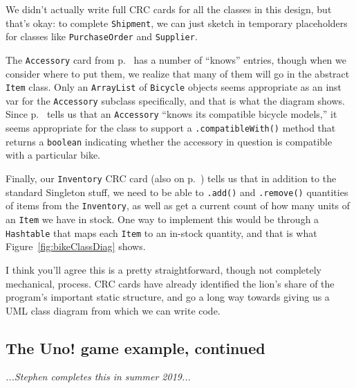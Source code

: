We didn't actually write full CRC cards for all the classes in this design, but
that's okay: to complete \texttt{Shipment}, we can just sketch in temporary
placeholders for classes like \texttt{PurchaseOrder} and \texttt{Supplier}.

The \texttt{Accessory} card from p.~\pageref{bikeCRC2} has a number of
``knows'' entries, though when we consider where to put them, we realize that
many of them will go in the abstract \texttt{Item} class. Only an
\texttt{ArrayList} of \texttt{Bicycle} objects seems appropriate as an inst var
for the \texttt{Accessory} subclass specifically, and that is what the diagram
shows. Since p.~\pageref{bikeCRC2} tells us that an \texttt{Accessory} ``knows
its compatible bicycle models,'' it seems appropriate for the class to support
a \texttt{.compatibleWith()} method that returns a \texttt{boolean} indicating
whether the accessory in question is compatible with a particular bike.

Finally, our \texttt{Inventory} CRC card (also on p.~\pageref{bikeCRC2}) tells
us that in addition to the standard Singleton stuff, we need to be able to
\texttt{.add()} and \texttt{.remove()} quantities of items from the
\texttt{Inventory}, as well as get a current count of how many units of an
\texttt{Item} we have in stock. One way to implement this would be through a
\texttt{Hashtable} that maps each \texttt{Item} to an in-stock quantity, and
that is what Figure~\ref{fig:bikeClassDiag} shows.

I think you'll agree this is a pretty straightforward, though not completely
mechanical, process. CRC cards have already identified the lion's share of the
program's important static structure, and go a long way towards giving us a UML
class diagram from which we can write code.

\subsection{The Uno! game example, continued}

\textit{...Stephen completes this in summer 2019...}


